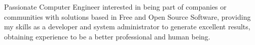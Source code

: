 \documentclass[9pt]{developercv} %
\begin{document}
\vspace{0.5cm}



\begin{minipage}[t]{0.4\textwidth} %
	\vspace{-\baselineskip} %
	
	Passionate Computer Engineer interested in being part of companies or communities with solutions based in Free and Open Source Software, providing my skills as a developer and system administrator to generate excellent results, obtaining experience to be a better professional and human being.   
\end{minipage}
\hfill %
\begin{minipage}[t]{0.5\textwidth} %
	\vspace{-\baselineskip} %
	\begin{barchart}{5.5}
	\end{barchart}
\end{minipage}


\end{document}
